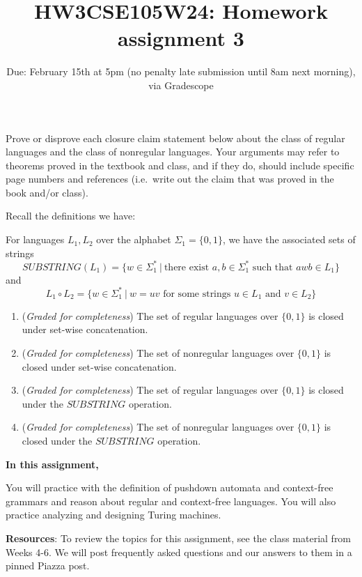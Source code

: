 \documentclass[12pt, oneside]{article}
\newcommand{\gradeComplete}{({\it Graded for completeness}) }
\begin{document}
\begin{enumerate}[wide, labelwidth=!, labelindent=0pt]
Prove or disprove each closure claim statement below about the class of regular languages
and the class of nonregular languages.
Your arguments may refer to theorems proved in the textbook and class, and if they do, should 
include specific page numbers and references (i.e.\ write out the claim that was proved in the book 
and/or class).

Recall the definitions we have: 

For languages $L_1, L_2$ over the alphabet $\Sigma_1 = \{0,1\}$, we have the 
associated sets of strings
\[
   SUBSTRING(L_1) = \{ w \in \Sigma_1^* ~|~ \text{there exist } a,b \in \Sigma_1^* \text{ such that } awb \in L_1\}
\]
and 
\[
   L_1 \circ L_2 = \{ w \in \Sigma_1^* ~|~ w = uv \text{ for some strings } u \in L_1 \text{ and } v \in L_2 \}
\]
\begin{enumerate}

    \item \gradeComplete The set of regular languages over $\{0,1\}$ is closed under set-wise concatenation.

    \item \gradeComplete The set of nonregular languages over $\{0,1\}$ is closed under set-wise concatenation.
 
   \item \gradeComplete The set of regular languages over $\{0,1\}$ is closed under the $SUBSTRING$ operation.

   \item \gradeComplete The set of nonregular languages over $\{0,1\}$ is closed under the $SUBSTRING$ operation.
\end{enumerate}
\end{enumerate}
\newpage

\title{HW3CSE105W24: Homework assignment 3}
\date{Due: February 15th at 5pm (no penalty late submission until 8am next morning), via Gradescope}



\maketitle
\thispagestyle{fancy}

{\bf In this assignment,}

You will  practice with the definition of pushdown automata and context-free grammars and reason
about regular and context-free languages. You will also practice analyzing and designing Turing machines.

{\bf Resources}: To review the topics 
for this assignment, see the class material from Weeks 4-6.
We will post frequently asked questions and our answers to them in a 
pinned Piazza post.
\end{document}
